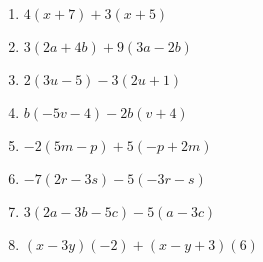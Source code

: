 \documentclass[12pt,letterpaper]{article}
\begin{document}
\begin{large}
\begin{enumerate}
\item \quad $4(x + 7) + 3(x + 5)$

\addvspace{0.5in}

\item \quad $3(2a + 4b) + 9(3a - 2b)$

\addvspace{0.5in}

\item \quad $2(3u - 5) - 3(2u + 1)$

\addvspace{0.5in}

\item \quad $b(-5v - 4) - 2b(v + 4)$

\addvspace{0.5in}

\item \quad $-2(5m - p) + 5(-p + 2m)$

\addvspace{0.5in}

\item \quad $-7(2r - 3s) - 5(-3r - s)$

\addvspace{0.5in}

\item \quad $3(2a - 3b - 5c) - 5(a - 3c)$

\addvspace{0.5in}

\item \quad $(x - 3y)(-2) + (x - y + 3)(6)$

\addvspace{0.5in}

\end{enumerate}
\end{large}
\end{document}
